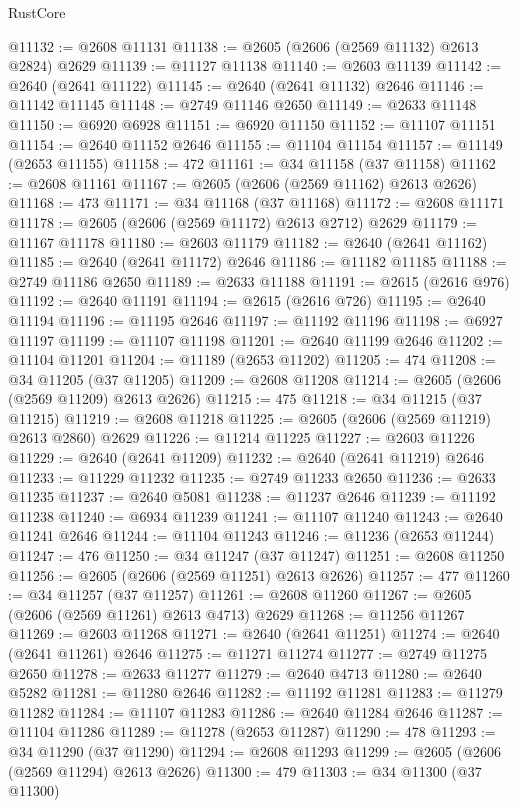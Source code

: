 \begin{lexlean}{RustCore}
\begin{coremodule}
@11132 := @2608 @11131
@11138 := @2605 (@2606 (@2569 @11132) @2613 @2824) @2629
@11139 := @11127 @11138
@11140 := @2603 @11139
@11142 := @2640 (@2641 @11122)
@11145 := @2640 (@2641 @11132) @2646
@11146 := @11142 @11145
@11148 := @2749 @11146 @2650
@11149 := @2633 @11148
@11150 := @6920 @6928
@11151 := @6920 @11150
@11152 := @11107 @11151
@11154 := @2640 @11152 @2646
@11155 := @11104 @11154
@11157 := @11149 (@2653 @11155)
@11158 := 472
@11161 := @34 @11158 (@37 @11158)
@11162 := @2608 @11161
@11167 := @2605 (@2606 (@2569 @11162) @2613 @2626)
@11168 := 473
@11171 := @34 @11168 (@37 @11168)
@11172 := @2608 @11171
@11178 := @2605 (@2606 (@2569 @11172) @2613 @2712) @2629
@11179 := @11167 @11178
@11180 := @2603 @11179
@11182 := @2640 (@2641 @11162)
@11185 := @2640 (@2641 @11172) @2646
@11186 := @11182 @11185
@11188 := @2749 @11186 @2650
@11189 := @2633 @11188
@11191 := @2615 (@2616 @976)
@11192 := @2640 @11191
@11194 := @2615 (@2616 @726)
@11195 := @2640 @11194
@11196 := @11195 @2646
@11197 := @11192 @11196
@11198 := @6927 @11197
@11199 := @11107 @11198
@11201 := @2640 @11199 @2646
@11202 := @11104 @11201
@11204 := @11189 (@2653 @11202)
@11205 := 474
@11208 := @34 @11205 (@37 @11205)
@11209 := @2608 @11208
@11214 := @2605 (@2606 (@2569 @11209) @2613 @2626)
@11215 := 475
@11218 := @34 @11215 (@37 @11215)
@11219 := @2608 @11218
@11225 := @2605 (@2606 (@2569 @11219) @2613 @2860) @2629
@11226 := @11214 @11225
@11227 := @2603 @11226
@11229 := @2640 (@2641 @11209)
@11232 := @2640 (@2641 @11219) @2646
@11233 := @11229 @11232
@11235 := @2749 @11233 @2650
@11236 := @2633 @11235
@11237 := @2640 @5081
@11238 := @11237 @2646
@11239 := @11192 @11238
@11240 := @6934 @11239
@11241 := @11107 @11240
@11243 := @2640 @11241 @2646
@11244 := @11104 @11243
@11246 := @11236 (@2653 @11244)
@11247 := 476
@11250 := @34 @11247 (@37 @11247)
@11251 := @2608 @11250
@11256 := @2605 (@2606 (@2569 @11251) @2613 @2626)
@11257 := 477
@11260 := @34 @11257 (@37 @11257)
@11261 := @2608 @11260
@11267 := @2605 (@2606 (@2569 @11261) @2613 @4713) @2629
@11268 := @11256 @11267
@11269 := @2603 @11268
@11271 := @2640 (@2641 @11251)
@11274 := @2640 (@2641 @11261) @2646
@11275 := @11271 @11274
@11277 := @2749 @11275 @2650
@11278 := @2633 @11277
@11279 := @2640 @4713
@11280 := @2640 @5282
@11281 := @11280 @2646
@11282 := @11192 @11281
@11283 := @11279 @11282
@11284 := @11107 @11283
@11286 := @2640 @11284 @2646
@11287 := @11104 @11286
@11289 := @11278 (@2653 @11287)
@11290 := 478
@11293 := @34 @11290 (@37 @11290)
@11294 := @2608 @11293
@11299 := @2605 (@2606 (@2569 @11294) @2613 @2626)
@11300 := 479
@11303 := @34 @11300 (@37 @11300)

\end{coremodule}
\end{lexlean}

